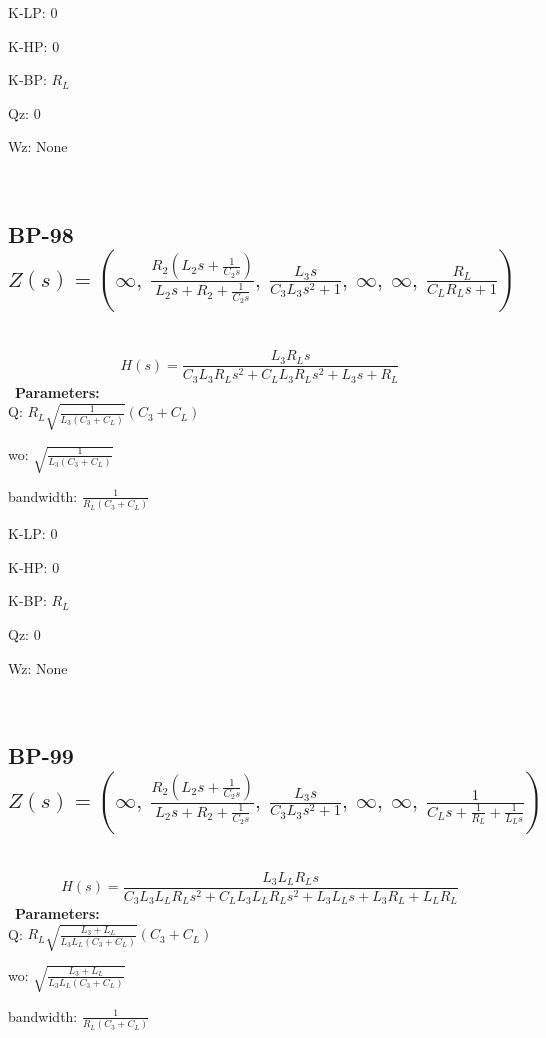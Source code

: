 \documentclass{article}
\begin{document}
K-LP: $0$\ 

K-HP: $0$\ 

K-BP: $R_{L}$\ 

Qz: $0$\ 

Wz: $\text{None}$\ 

\ 

\subsection{BP-98 $Z(s) = \left( \infty, \  \frac{R_{2} \left(L_{2} s + \frac{1}{C_{2} s}\right)}{L_{2} s + R_{2} + \frac{1}{C_{2} s}}, \  \frac{L_{3} s}{C_{3} L_{3} s^{2} + 1}, \  \infty, \  \infty, \  \frac{R_{L}}{C_{L} R_{L} s + 1}\right)$ } \ 
\textbf{\[H(s) = \frac{L_{3} R_{L} s}{C_{3} L_{3} R_{L} s^{2} + C_{L} L_{3} R_{L} s^{2} + L_{3} s + R_{L}}\] } \ 
\textbf{Parameters:}\\ 

Q: $R_{L} \sqrt{\frac{1}{L_{3} \left(C_{3} + C_{L}\right)}} \left(C_{3} + C_{L}\right)$\ 

wo: $\sqrt{\frac{1}{L_{3} \left(C_{3} + C_{L}\right)}}$\ 

bandwidth: $\frac{1}{R_{L} \left(C_{3} + C_{L}\right)}$\ 

K-LP: $0$\ 

K-HP: $0$\ 

K-BP: $R_{L}$\ 

Qz: $0$\ 

Wz: $\text{None}$\ 

\ 

\subsection{BP-99 $Z(s) = \left( \infty, \  \frac{R_{2} \left(L_{2} s + \frac{1}{C_{2} s}\right)}{L_{2} s + R_{2} + \frac{1}{C_{2} s}}, \  \frac{L_{3} s}{C_{3} L_{3} s^{2} + 1}, \  \infty, \  \infty, \  \frac{1}{C_{L} s + \frac{1}{R_{L}} + \frac{1}{L_{L} s}}\right)$ } \ 
\textbf{\[H(s) = \frac{L_{3} L_{L} R_{L} s}{C_{3} L_{3} L_{L} R_{L} s^{2} + C_{L} L_{3} L_{L} R_{L} s^{2} + L_{3} L_{L} s + L_{3} R_{L} + L_{L} R_{L}}\] } \ 
\textbf{Parameters:}\\ 

Q: $R_{L} \sqrt{\frac{L_{3} + L_{L}}{L_{3} L_{L} \left(C_{3} + C_{L}\right)}} \left(C_{3} + C_{L}\right)$\ 

wo: $\sqrt{\frac{L_{3} + L_{L}}{L_{3} L_{L} \left(C_{3} + C_{L}\right)}}$\ 

bandwidth: $\frac{1}{R_{L} \left(C_{3} + C_{L}\right)}$\ 
\end{document}
